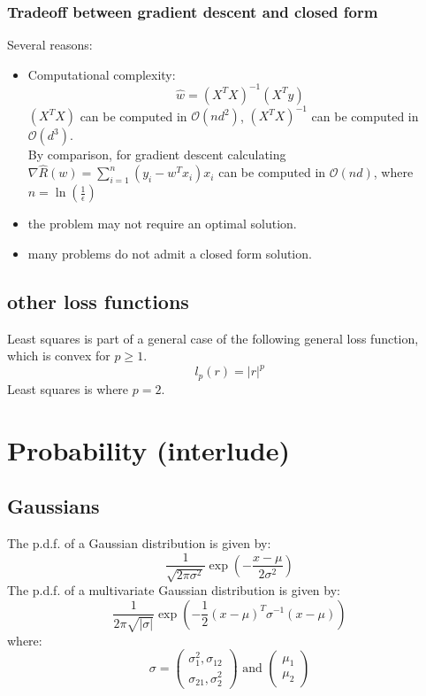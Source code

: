 \documentclass[a4paper,10pt,twoside]{article}
\begin{document}
\subsubsection{Tradeoff between gradient descent and closed form}
Several reasons:
\begin{itemize}
    \item Computational complexity:
    \begin{equation*}
        \hat{w}=(X^TX)^{-1}(X^Ty)
    \end{equation*}
    $(X^TX)$ can be computed in $\mathcal{O}(nd^2)$, $(X^TX)^{-1}$ can be computed in $\mathcal{O}(d^3)$.\\
    By comparison, for gradient descent calculating $\nabla\hat{R}(w)=\sum_{i=1}^{n}(y_i-w^Tx_i)x_i$ can be computed in $\mathcal{O}(nd)$, where $n=\ln(\frac{1}{\epsilon})$
    \item the problem may not require an optimal solution.
    \item many problems do not admit a closed form solution.
\end{itemize}
\subsection{other loss functions}
Least squares is part of a general case of the following general loss function, which is convex for $p\geq 1$.
\begin{equation}
    l_p(r)=|r|^p
\end{equation}
Least squares is where $p=2$.

\section{Probability (interlude)}
\subsection{Gaussians}

The p.d.f. of a Gaussian distribution is given by:
\begin{equation}
    \frac{1}{\sqrt{2\pi\sigma^2}}\exp\left(-\frac{x-\mu}{2\sigma^2}\right)
\end{equation}
The p.d.f. of a multivariate Gaussian distribution is given by:
\begin{equation}
    \frac{1}{2\pi\sqrt{|\sigma|}}\exp\left(-\frac{1}{2}(x-\mu)^T\sigma^{-1}(x-\mu)\right)
\end{equation}
where:
\begin{equation}
    \sigma = \begin{pmatrix}
        \sigma_{1}^2, \sigma_{12}\\
        \sigma_{21}, \sigma_{2}^2
    \end{pmatrix}
    \text{ and }
    \begin{pmatrix}
        \mu_1\\
        \mu_2
    \end{pmatrix}
\end{equation}
\end{document}
